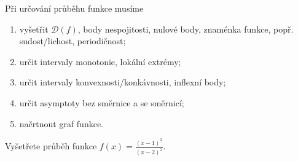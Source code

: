 \begin{pozn}
    Při určování průběhu funkce musíme
    \begin{enumerate}[$i.$]
    \item vyšetřit $\mathcal D(f)$, body nespojitosti, nulové body, znaménka funkce, popř.
    sudost/lichost, periodičnost;
   	\item určit intervaly monotonie, lokální extrémy;
   	\item určit intervaly konvexnosti/konkávnosti, inflexní body;
   	\item určit asymptoty bez směrnice a se směrnicí;
   	\item načrtnout graf funkce.
    \end{enumerate}
\end{pozn}

\begin{priklad}
Vyšetřete průběh funkce $f(x)=\frac{(x-1)^3}{(x-2)^2}$.
\end{priklad}

